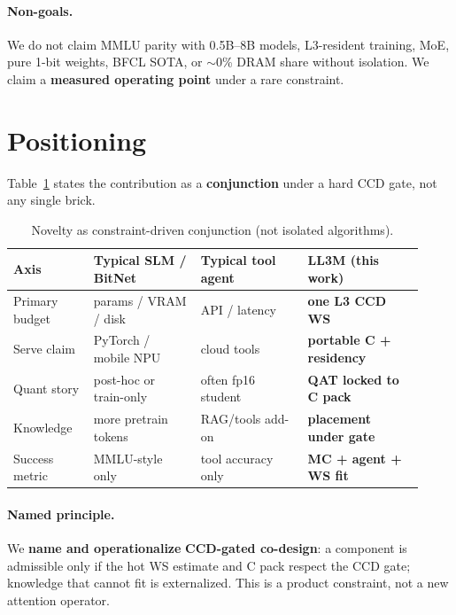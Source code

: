 \documentclass[11pt,a4paper]{article}
\begin{document}
\paragraph{Non-goals.}
We do not claim MMLU parity with 0.5B--8B models, L3-resident training, MoE, pure 1-bit weights, BFCL SOTA, or $\sim$0\% DRAM share without isolation.
We claim a \textbf{measured operating point} under a rare constraint.

\section{Positioning}
\label{sec:novelty}

Table~\ref{tab:novelty} states the contribution as a \textbf{conjunction} under a hard CCD gate, not any single brick.

\begin{table}[H]
\centering
\caption{Novelty as constraint-driven conjunction (not isolated algorithms).}
\label{tab:novelty}
\small
\setlength{\tabcolsep}{3.5pt}
\begin{tabular}{@{}p{0.18\linewidth}p{0.24\linewidth}p{0.24\linewidth}p{0.26\linewidth}@{}}
\toprule
Axis & Typical SLM / BitNet & Typical tool agent & \textbf{LL3M (this work)} \\
\midrule
Primary budget & params / VRAM / disk & API / latency & \textbf{one L3 CCD WS} \\
Serve claim & PyTorch / mobile NPU & cloud tools & \textbf{portable C + residency} \\
Quant story & post-hoc or train-only & often fp16 student & \textbf{QAT locked to C pack} \\
Knowledge & more pretrain tokens & RAG/tools add-on & \textbf{placement under gate} \\
Success metric & MMLU-style only & tool accuracy only & \textbf{MC + agent + WS fit} \\
\bottomrule
\end{tabular}
\end{table}

\paragraph{Named principle.}
We \textbf{name and operationalize} \textbf{CCD-gated co-design}: a component is admissible only if the hot WS estimate and C pack respect the CCD gate; knowledge that cannot fit is externalized.
This is a product constraint, not a new attention operator.
\end{document}

